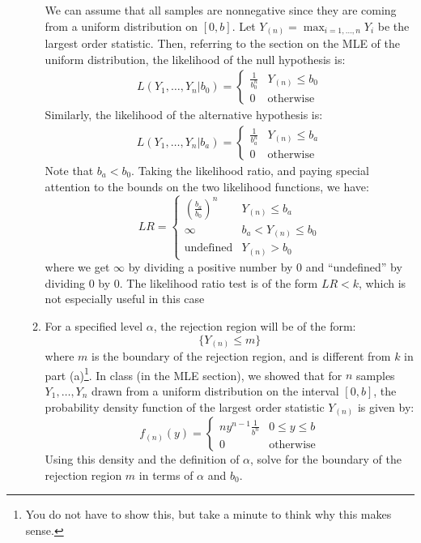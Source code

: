 \documentclass[12pt]{article}
\begin{document}
\begin{enumerate}
\begin{enumerate}
We can assume that all samples are nonnegative since they are coming from a uniform distribution on $[0, b]$. Let $Y_{(n)} = \max_{i = 1, \dots, n}Y_i$ be the largest order statistic. Then, referring to the section on the MLE of the uniform distribution, the likelihood of the null hypothesis is:
\begin{align*}
L(Y_1, \dots, Y_n | b_0) = \begin{cases}
\frac{1}{b_0^n} & Y_{(n)} \leq b_0 \\
0 & \text{otherwise}
\end{cases}
\end{align*}
Similarly, the likelihood of the alternative hypothesis is:
\begin{align*}
L(Y_1, \dots, Y_n | b_a) = \begin{cases}
\frac{1}{b_a^n} & Y_{(n)} \leq b_a \\
0 & \text{otherwise}
\end{cases}
\end{align*}
Note that $b_a < b_0$. Taking the likelihood ratio, and paying special attention to the bounds on the two likelihood functions, we have:
\[
LR = \begin{cases}
\left( \frac{b_a}{b_0} \right)^n & Y_{(n)} \leq b_a \\
\infty & b_a < Y_{(n)} \leq b_0 \\
\text{undefined} & Y_{(n)} > b_0
\end{cases}
\]
where we get $\infty$ by dividing a positive number by 0 and ``undefined'' by dividing 0 by 0. The likelihood ratio test is of the form $LR < k$, which is not especially useful in this case

\item For a specified level $\alpha$, the rejection region will be of the form:
\[
\{ Y_{(n)} \leq m \}
\]
where $m$ is the boundary of the rejection region, and is different from $k$ in part (a)\footnote{You do not have to show this, but take a minute to think why this makes sense.}. In class (in the MLE section), we showed that for $n$ samples $Y_1, \dots, Y_n$ drawn from a uniform distribution on the interval $[0, b]$, the probability density function of the largest order statistic $Y_{(n)}$ is given by:
\[
f_{(n)}(y) = \begin{cases}
n y^{n-1} \frac{1}{b^n} & 0 \leq y \leq b \\
0 & \text{otherwise}
\end{cases}
\]
Using this density and the definition of $\alpha$, solve for the boundary of the rejection region $m$ in terms of $\alpha$ and $b_0$. 
\end{enumerate}


\end{enumerate}
\end{document}
